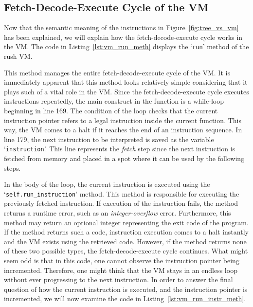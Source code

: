 \subsection{Fetch-Decode-Execute Cycle of the VM}
Now that the semantic meaning of the instructions in Figure~\ref{fig:tree_vs_vm} has been explained, we will explain how the fetch-decode-execute cycle works in the VM\@.
The code in Listing~\ref{lst:vm_run_meth} displays the `\texttt{run}' method of the rush VM\@.


This method manages the entire fetch-decode-execute cycle of the VM\@.
It is immediately apparent that this method looks relatively simple considering that it plays such of a vital role in the VM\@.
Since the fetch-decode-execute cycle executes instructions repeatedly, the main construct in the function is a while-loop beginning in line 169.
The condition of the loop checks that the current instruction pointer refers to a legal instruction inside the current function.
This way, the VM comes to a halt if it reaches the end of an instruction sequence.
In line 179, the next instruction to be interpreted is saved as the variable `\texttt{instruction}'.
This line represents the \emph{fetch} step since the next instruction is fetched from memory and placed in a spot where it can be used by the following steps.

In the body of the loop, the current instruction is executed using the `\texttt{self.run\_instruction}' method.
This method is responsible for executing the previously fetched instruction.
If execution of the instruction fails, the method returns a runtime error, such as an \emph{integer-overflow} error.
Furthermore, this method may return an optional integer representing the exit code of the program.
If the method returns such a code, instruction execution comes to a halt instantly and the VM exists using the retrieved code.
However, if the method returns none of these two possible types, the fetch-decode-execute cycle continues.
What might seem odd is that in this code, one cannot observe the instruction pointer being incremented.
Therefore, one might think that the VM stays in an endless loop without ever progressing to the next instruction.
In order to answer the final question of how the current instruction is executed, and the instruction pointer is incremented, we will now examine the code in Listing~\ref{lst:vm_run_instr_meth}.

